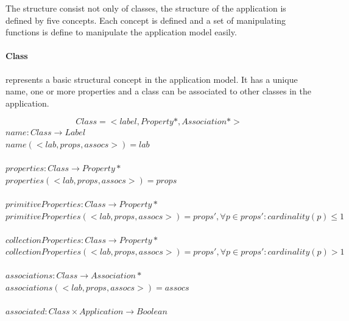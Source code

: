 \documentclass[11pt]{article}
\begin{document}
The structure consist not only of classes, the structure of the application is defined by five concepts. Each concept is defined and a set of manipulating functions is define to manipulate the application model easily.

\paragraph{Class} represents a basic structural concept in the application model. It has a unique name, one or more properties and a class can be associated to other classes in the application. 
	 
$$Class = < label, Property*, Association* >$$
$name : Class \rightarrow Label$ \\
$name(< lab, props, assocs  >) = lab$ \\ \\
$properties : Class \rightarrow Property*$ \\
$properties(< lab, props, assocs  >) = props $\\ \\
$primitiveProperties : Class \rightarrow Property*$ \\
$primitiveProperties(< lab, props, assocs  >) = props', \forall p \in props' : cardinality(p) \leq 1 $\\ \\
$collectionProperties : Class \rightarrow Property*$ \\
$collectionProperties(< lab, props, assocs  >) = props', \forall p \in props' : cardinality(p) > 1 $\\ \\
$associations : Class \rightarrow Association*$ \\
$associations(< lab, props, assocs  >) = assocs $ \\ \\
$associated :  Class \times Application \rightarrow Boolean $
\end{document}
